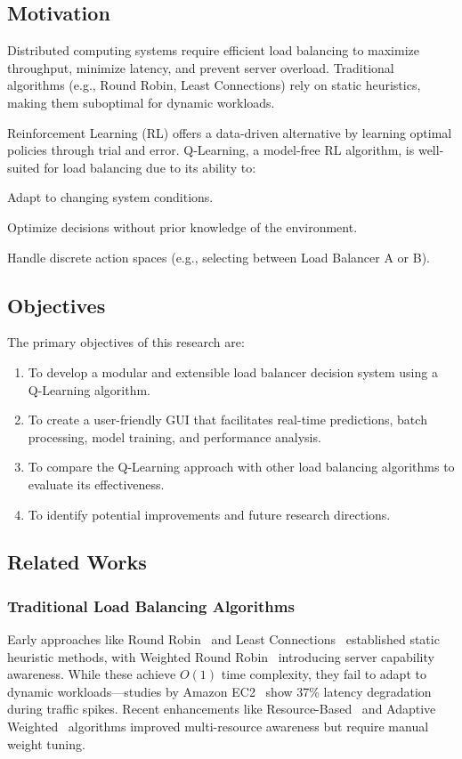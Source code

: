 \documentclass[runningheads]{llncs}
\begin{document}
\subsection{Motivation}
Distributed computing systems require efficient load balancing to maximize throughput, minimize latency, and prevent server overload. Traditional algorithms (e.g., Round Robin, Least Connections) rely on static heuristics, making them suboptimal for dynamic workloads.

Reinforcement Learning (RL) offers a data-driven alternative by learning optimal policies through trial and error. Q-Learning, a model-free RL algorithm, is well-suited for load balancing due to its ability to:
\item Adapt to changing system conditions.
    \item Optimize decisions without prior knowledge of the environment.
    \item Handle discrete action spaces (e.g., selecting between Load Balancer A or B).

\subsection{Objectives}
The primary objectives of this research are:
\begin{enumerate}
    \item To develop a modular and extensible load balancer decision system using a Q-Learning algorithm.
    \item To create a user-friendly GUI that facilitates real-time predictions, batch processing, model training, and performance analysis.
    \item To compare the Q-Learning approach with other load balancing algorithms to evaluate its effectiveness.
    \item To identify potential improvements and future research directions.
\end{enumerate}

\subsection{Related Works}
\subsubsection{Traditional Load Balancing Algorithms}
Early approaches like Round Robin~\cite{1} and Least Connections~\cite{2} established static heuristic methods, with Weighted Round Robin~\cite{3} introducing server capability awareness. While these achieve $O(1)$ time complexity, they fail to adapt to dynamic workloads—studies by Amazon EC2~\cite{4} show 37\% latency degradation during traffic spikes. Recent enhancements like Resource-Based~\cite{5} and Adaptive Weighted~\cite{6} algorithms improved multi-resource awareness but require manual weight tuning.
\end{document}
